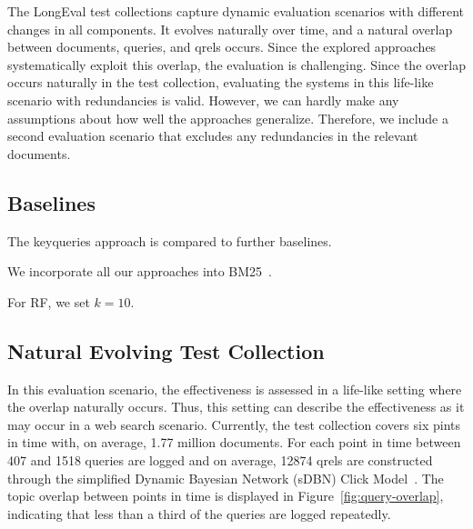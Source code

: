 




The LongEval test collections capture dynamic evaluation scenarios with different changes in all components. It evolves naturally over time, and a natural overlap between documents, queries, and qrels occurs. Since the explored approaches systematically exploit this overlap, the evaluation is challenging. Since the overlap occurs naturally in the test collection, evaluating the systems in this life-like scenario with redundancies is valid. However, we can hardly make any assumptions about how well the approaches generalize. Therefore, we include a second evaluation scenario that excludes any redundancies in the relevant documents.

  
\subsection{Baselines}
The keyqueries approach is compared to further baselines. 

We incorporate all our approaches into BM25~\cite{robertson:1994}.

For RF, we set $k=10$.


\subsection{Natural Evolving Test Collection}
In this evaluation scenario, the effectiveness is assessed in a life-like setting where the overlap naturally occurs. Thus, this setting can describe the effectiveness as it may occur in a web search scenario. Currently, the test collection covers six pints in time with, on average, 1.77 million documents. For each point in time between 407 and 1518 queries are logged and on average, 12874 qrels are constructed through the simplified Dynamic Bayesian Network (sDBN) Click Model~\cite{chapelle:2009}. The topic overlap between points in time is displayed in Figure~\ref{fig:query-overlap}, indicating that less than a third of the queries are logged repeatedly.



